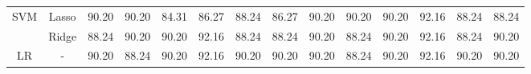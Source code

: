 \begin{landscape}
\begin{table}[]
{\begin{tabular}{cc|clllllclllll}
\multirow{2}{*}{SVM}            
                                & Lasso                                 & 90.20                                                             & 90.20                                                                & 84.31                                                                & 86.27                                                               & 88.24                                                            & \multicolumn{1}{c|}{86.27}                                                                   & 90.20                                                             & 90.20                                                                & 90.20                                                                & 92.16                                                               & 88.24                                                            & 88.24                                                                   \\ 
                                & Ridge                                 & 88.24                                                             & 90.20                                                                & 90.20                                                                & 92.16                                                               & 88.24                                                            & \multicolumn{1}{c|}{88.24}                                                                   & 90.20                                                             & 88.24                                                                & 90.20                                                                & 92.16                                                               & 88.24                                                            & 90.20                                                                   \\ \hline
\multirow{3}{*}{LR}             & -                                     & 90.20                                                             & 88.24                                                                & 90.20                                                                & 92.16                                                               & 90.20                                                            & \multicolumn{1}{c|}{90.20}                                                                   & 90.20                                                             & 88.24                                                                & 90.20                                                                & 92.16                                                               & 90.20                                                            & 90.20                                                                   \\
                               

\end{tabular}}
\end{table}
\end{landscape}
